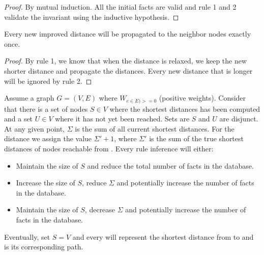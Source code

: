 \begin{proof}
By mutual induction. All the initial facts are valid and rule 1 and 2 validate the
invariant using the inductive hypothesis.
\end{proof}

\begin{lemma}[Relaxation]
Every new improved distance will be propagated to the neighbor nodes exactly once.
\end{lemma}
\begin{proof}
By rule 1, we know that when the distance is relaxed, we keep the new shorter
distance and propagate the distances. Every new distance that is longer will be
ignored by rule 2.
\end{proof}

\begin{theorem}[Correctness]

   Assume a graph $G = (V, E)$ where $W_{e \in E) >= 0}$ (positive weights).
   Consider that there is a set of nodes $S \in V$ where the shortest distances
   has been computed and a set $U \in V$ where it has not yet been reached.
   Sets are $S$ and $U$ are disjunct. At any given point, $\Sigma$ is the sum of
   all current shortest distances. For the distance  we assign the
   value $\Sigma' + 1$, where $\Sigma'$ is the sum of the true shortest
   distances of nodes reachable from .  Every rule inference will
   either:

   \begin{itemize}
      \item Maintain the size of $S$ and reduce the total number of facts in
         the database.
      \item Increase the size of $S$, reduce $\Sigma$ and potentially increase the number of
         facts in the database.
      \item Maintain the size of $S$, decrease $\Sigma$
         and potentially increase the number of facts in the database.
   \end{itemize}

   Eventually, set $S = V$ and every  will represent
   the shortest distance from  to  and  is its
   corresponding path.
\end{theorem}

